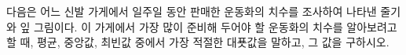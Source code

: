 다음은 어느 신발 가게에서 일주일 동안 판매한 운동화의 치수를 조사하여 나타낸 줄기와 잎 그림이다. 이 가게에서 가장 많이 준비해 두어야 할 운동화의 치수를 알아보려고 할 때, 평균, 중앙값, 최빈값 중에서 가장 적절한 대푯값을 말하고, 그 값을 구하시오.
\par\smallskip\begin{center}\resizebox{\ifdim\width>\linewidth\linewidth\else\width\fi}{!}{}\end{center}
